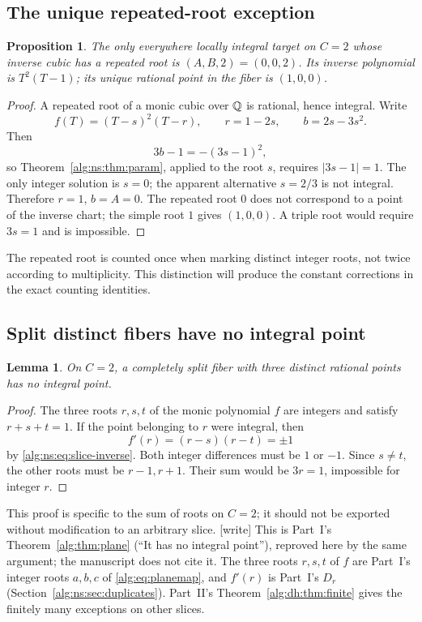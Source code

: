 \documentclass[11pt]{article}
\numberwithin{equation}{section}
\theoremstyle{plain}
\newtheorem{proposition}[proposition]{Proposition}
\theoremstyle{plain}
\newtheorem{lemma}[lemma]{Lemma}
\theoremstyle{plain}
\theoremstyle{definition}
\theoremstyle{definition}
\theoremstyle{definition}
\theoremstyle{remark}
\newcommand{\wtag}{\textup{[write]}}%
\begin{document}
\subsection{The unique repeated-root exception}
\begin{proposition}\label{alg:ns:prop:repeated}
The only everywhere locally integral target on $C=2$ whose inverse
cubic has a repeated root is $(A,B,2)=(0,0,2)$. Its inverse polynomial
is $T^2(T-1)$; its unique rational point in the fiber is $(1,0,0)$.
\end{proposition}
\begin{proof}
A repeated root of a monic cubic over $\mathbb Q$ is rational, hence integral.
Write
\[
f(T)=(T-s)^2(T-r),\qquad r=1-2s,\qquad b=2s-3s^2.
\]
Then
\[
3b-1=-(3s-1)^2,
\]
so Theorem~\ref{alg:ns:thm:param}, applied to the root $s$, requires
$|3s-1|=1$. The only integer solution is $s=0$; the apparent alternative
$s=2/3$ is not integral. Therefore $r=1$, $b=A=0$. The repeated root
$0$ does not correspond to a point of the inverse chart; the simple root
$1$ gives $(1,0,0)$. A triple root would require $3s=1$ and is impossible.
\end{proof}
The repeated root is counted once when marking distinct integer roots,
not twice according to multiplicity. This distinction will produce the
constant corrections in the exact counting identities.

\subsection{Split distinct fibers have no integral point}
\begin{lemma}\label{alg:ns:lem:split-nointeger}
On $C=2$, a completely split fiber with three distinct rational points
has no integral point.
\end{lemma}
\begin{proof}
The three roots $r,s,t$ of the monic polynomial $f$ are integers and
satisfy $r+s+t=1$. If the point belonging to $r$ were integral, then
\[
f'(r)=(r-s)(r-t)=\pm1
\]
by \eqref{alg:ns:eq:slice-inverse}. Both integer differences must be $1$ or
$-1$. Since $s\ne t$, the other roots must be $r-1,r+1$. Their sum
would be $3r=1$, impossible for integer $r$.
\end{proof}
This proof is specific to the sum of roots on $C=2$; it should not be
exported without modification to an arbitrary slice.
\wtag{} This is Part~I's Theorem~\ref{alg:thm:plane} (``It has no
integral point''), reproved here by the same argument; the manuscript
does not cite it. The three roots $r,s,t$ of $f$ are Part~I's integer
roots $a,b,c$ of \eqref{alg:eq:planemap}, and $f'(r)$ is Part~I's $D_r$
(Section~\ref{alg:ns:sec:duplicates}). Part~II's
Theorem~\ref{alg:dh:thm:finite} gives the finitely many exceptions on
other slices.
\end{document}
